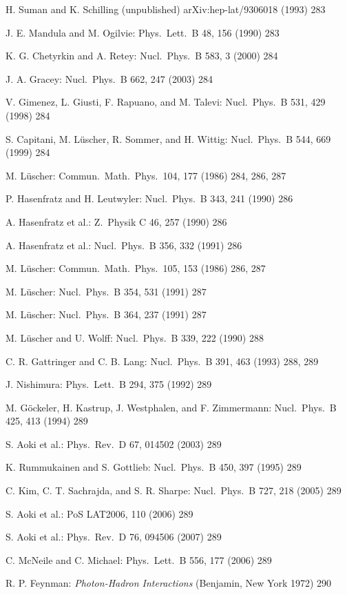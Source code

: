 \begin{enumerate}[label={[\arabic*]}]
  \item H. Suman and K. Schilling (unpublished) arXiv:hep-lat/9306018 (1993) 283
  \item J. E. Mandula and M. Ogilvie: Phys.\ Lett.\ B 48, 156 (1990) 283
  \item K. G. Chetyrkin and A. Retey: Nucl.\ Phys.\ B 583, 3 (2000) 284
  \item J. A. Gracey: Nucl.\ Phys.\ B 662, 247 (2003) 284
  \item V. Gimenez, L. Giusti, F. Rapuano, and M. Talevi: Nucl.\ Phys.\ B 531, 429 (1998) 284
  \item S. Capitani, M. L\"uscher, R. Sommer, and H. Wittig: Nucl.\ Phys.\ B 544, 669 (1999) 284
  \item M. L\"uscher: Commun.\ Math.\ Phys.\ 104, 177 (1986) 284, 286, 287
  \item P. Hasenfratz and H. Leutwyler: Nucl.\ Phys.\ B 343, 241 (1990) 286
  \item A. Hasenfratz et al.: Z.\ Physik C 46, 257 (1990) 286
  \item A. Hasenfratz et al.: Nucl.\ Phys.\ B 356, 332 (1991) 286
  \item M. L\"uscher: Commun.\ Math.\ Phys.\ 105, 153 (1986) 286, 287
  \item M. L\"uscher: Nucl.\ Phys.\ B 354, 531 (1991) 287
  \item M. L\"uscher: Nucl.\ Phys.\ B 364, 237 (1991) 287
  \item M. L\"uscher and U. Wolff: Nucl.\ Phys.\ B 339, 222 (1990) 288
  \item C. R. Gattringer and C. B. Lang: Nucl.\ Phys.\ B 391, 463 (1993) 288, 289
  \item J. Nishimura: Phys.\ Lett.\ B 294, 375 (1992) 289
  \item M. G\"ockeler, H. Kastrup, J. Westphalen, and F. Zimmermann: Nucl.\ Phys.\ B 425, 413 (1994) 289
  \item S. Aoki et al.: Phys.\ Rev.\ D 67, 014502 (2003) 289
  \item K. Rummukainen and S. Gottlieb: Nucl.\ Phys.\ B 450, 397 (1995) 289
  \item C. Kim, C. T. Sachrajda, and S. R. Sharpe: Nucl.\ Phys.\ B 727, 218 (2005) 289
  \item S. Aoki et al.: PoS LAT2006, 110 (2006) 289
  \item S. Aoki et al.: Phys.\ Rev.\ D 76, 094506 (2007) 289
  \item C. McNeile and C. Michael: Phys.\ Lett.\ B 556, 177 (2006) 289
  \item R. P. Feynman: \emph{Photon-Hadron Interactions} (Benjamin, New York 1972) 290

\end{enumerate}
